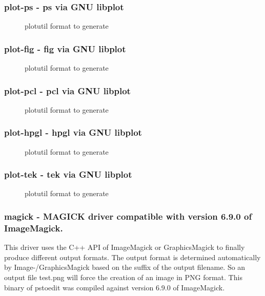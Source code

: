 \documentclass[english,a4paper]{article}
\begin{document}
\subsubsection{plot-ps - ps via GNU libplot}
\begin{description}
\item[]
plotutil format to generate


\end{description}
\subsubsection{plot-fig - fig via GNU libplot}
\begin{description}
\item[]
plotutil format to generate


\end{description}
\subsubsection{plot-pcl - pcl via GNU libplot}
\begin{description}
\item[]
plotutil format to generate


\end{description}
\subsubsection{plot-hpgl - hpgl via GNU libplot}
\begin{description}
\item[]
plotutil format to generate


\end{description}
\subsubsection{plot-tek - tek via GNU libplot}
\begin{description}
\item[]
plotutil format to generate


\end{description}
\subsubsection{magick - MAGICK driver compatible with version 6.9.0 of ImageMagick.}
This driver uses the C++ API of ImageMagick or GraphicsMagick to finally produce different output formats. The output format is determined automatically by Image-/GraphicsMagick based on the suffix of the output filename. So an output file test.png will force the creation of an image in PNG format. This binary of pstoedit was compiled against version 6.9.0 of ImageMagick.
\end{document}
